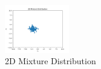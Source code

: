 \documentclass[a4paper]{article}
\theoremstyle{definition}
\newenvironment{soln}{
	\leavevmode\color{blue}\ignorespaces
}{}
\begin{document}
\begin{enumerate}
		\begin{soln}
		\begin{figure}[h!]
		    \centering
		    \includegraphics[width=0.25\textwidth]{images/2d_sumdata.png}  
		    \captionsetup{labelformat=empty}
		    \caption{2D Mixture Distribution}
		    \label{fig:mixdist}
		\end{figure}
	\end{soln}
	\end{enumerate}
	
	
	
	
	
	
	
\end{document}
